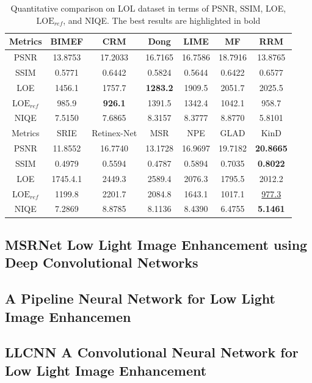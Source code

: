 \documentclass[letterpaper,12pt]{article}
\begin{document}
	\begin{table}[!htbp]
		\centering
		\tiny
		\begin{tabular}{c|cccccc} %
			\hline %
			Metrics & BIMEF & CRM & Dong & LIME & MF & RRM \\
			\hline %
			PSNR & 13.8753 & 17.2033 & 16.7165 & 16.7586 & 18.7916 & 13.8765 \\
			SSIM & 0.5771 & 0.6442 & 0.5824 & 0.5644 & 0.6422 & 0.6577 \\
			 LOE & 1456.1 & 1757.7 & \textbf{1283.2} & 1909.5 & 2051.7 & 2025.5\\
			$\text{LOE}_{ref}$ & 985.9 & \textbf{926.1} & 1391.5 & 1342.4 & 1042.1 & 958.7\\
			NIQE & 7.5150 & 7.6865 & 8.3157 & 8.3777 & 8.8770 & 5.8101\\
			\hline %
			Metrics & SRIE & Retinex-Net & MSR & NPE & GLAD & KinD \\
			\hline %
			PSNR & 11.8552 & 16.7740 & 13.1728 & 16.9697 & 19.7182 & \textbf{20.8665} \\
			SSIM & 0.4979 & 0.5594 & 0.4787 & 0.5894 & 0.7035 & \textbf{0.8022} \\
			LOE & 1745.4.1 & 2449.3 & 2589.4 & 2076.3 & 1795.5 & 2012.2\\
			$\text{LOE}_{ref}$ & 1199.8 & 2201.7 & 2084.8 & 1643.1 & 1017.1 & \underline{977.3}\\
			NIQE & 7.2869 & 8.8785 & 8.1136 & 8.4390 & 6.4755 & \textbf{5.1461} \\
			\hline %
		\end{tabular}
		\captionsetup{font=scriptsize} %
		\caption{\label{tab:Quantitative}Quantitative comparison on LOL dataset in terms of PSNR, SSIM, LOE, $\text{LOE}_{ref}$, and NIQE. The best results are highlighted in bold} %
	\end{table}

	
	\subsection{MSRNet Low Light Image Enhancement using Deep Convolutional Networks}
	
	\subsection{A Pipeline Neural Network for Low Light Image Enhancemen}
	\subsection{LLCNN A Convolutional Neural Network for Low Light Image Enhancement}
\end{document}
